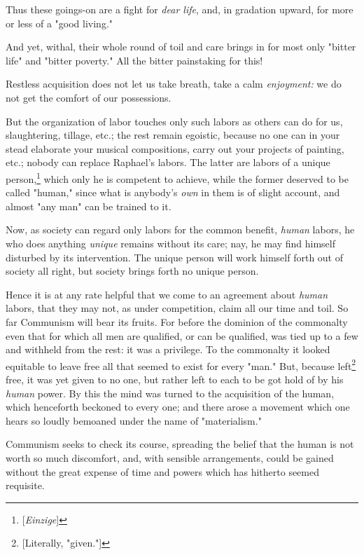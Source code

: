 Thus these goings-on are a fight for \textit{dear life}, and, in gradation 
upward, for more or less of a "{}good living."{}

And yet, withal, their whole round of toil and care brings in for most only 
"{}bitter life"{} and "{}bitter poverty."{} All the bitter painstaking for 
this!

Restless acquisition does not let us take breath, take a calm 
\textit{enjoyment:} we do not get the comfort of our possessions.

But the organization of labor touches only such labors as others can do for 
us, slaughtering, tillage, etc.; the rest remain egoistic, because no one can 
in your stead elaborate your musical compositions, carry out your projects of 
painting, etc.; nobody can replace Raphael's labors. The latter are labors of 
a unique person,\footnote{[\textit{Einzige}]} which only he is competent to 
achieve, while the former deserved to be called "{}human,"{} since what is 
anybody's \textit{own} in them is of slight account, and almost "{}any man"{} 
can be trained to it.

Now, as society can regard only labors for the common benefit, \textit{human} 
labors, he who does anything \textit{unique} remains without its care; nay, he 
may find himself disturbed by its intervention. The unique person will work 
himself forth out of society all right, but society brings forth no unique 
person.

Hence it is at any rate helpful that we come to an agreement about 
\textit{human} labors, that they may not, as under competition, claim all our 
time and toil. So far Communism will bear its fruits. For before the dominion 
of the commonalty even that for which all men are qualified, or can be 
qualified, was tied up to a few and withheld from the rest: it was a 
privilege. To the commonalty it looked equitable to leave free all that seemed 
to exist for every "{}man."{} But, because left\footnote{[Literally, 
"{}given."{}]} free, it was yet given to no one, but rather left to each to be 
got hold of by his \textit{human} power. By this the mind was turned to the 
acquisition of the human, which henceforth beckoned to every one; and there 
arose a movement which one hears so loudly bemoaned under the name of 
"{}materialism."{}

Communism seeks to check its course, spreading the belief that the human is 
not worth so much discomfort, and, with sensible arrangements, could be gained 
without the great expense of time and powers which has hitherto seemed 
requisite.

